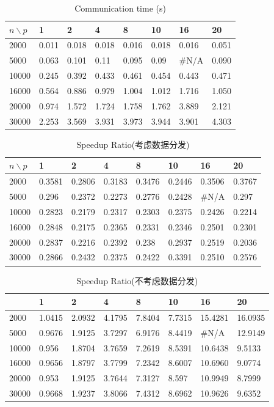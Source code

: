 \documentclass[UTF8, onecolumn, a4paper]{article}
\begin{document}
\begin{table}[htb]
	\centering
	\begin{tabular}{l|lllllll}
		\hline
		$n \backslash p$& 1 & 2 & 4 & 8 & 10 & 16 & 20 \\ \hline
		2000 & 0.011 & 0.018 & 0.018 & 0.016 & 0.018 & 0.016 & 0.051 \\ \hline
		5000 & 0.063 & 0.101 & 0.11 & 0.095 & 0.09 & \#N/A & 0.090 \\ \hline
		10000 & 0.245 & 0.392 & 0.433 & 0.461 & 0.454 & 0.443 & 0.471 \\ \hline
		16000 & 0.564 & 0.886 & 0.979 & 1.004 & 1.012 & 1.716 & 1.050 \\ \hline
		20000 & 0.974 & 1.572 & 1.724 & 1.758 & 1.762 & 3.889 & 2.121 \\ \hline
		30000 & 2.253 & 3.569 & 3.931 & 3.973 & 3.944 & 3.901 & 4.303 \\ \hline
	\end{tabular}
	\caption{Communication time (s)}
\end{table}
\begin{table}[htb]
	\centering
	\begin{tabular}{l|lllllll}
		\hline
		$n \backslash p$& 1 & 2 & 4 & 8 & 10 & 16 & 20 \\ \hline
		2000 & 0.3581 & 0.2806 & 0.3183 & 0.3476 & 0.2446 & 0.3506 & 0.3767 \\ \hline
		5000 & 0.296 & 0.2372 & 0.2273 & 0.2776 & 0.2428 & \#N/A & 0.297 \\ \hline
		10000 & 0.2823 & 0.2179 & 0.2317 & 0.2303 & 0.2375 & 0.2426 & 0.2214 \\ \hline
		16000 & 0.2848 & 0.2175 & 0.2365 & 0.2331 & 0.2346 & 0.2501 & 0.2301 \\ \hline
		20000 & 0.2837 & 0.2216 & 0.2392 & 0.238 & 0.2937 & 0.2519 & 0.2036 \\ \hline
		30000 & 0.2866 & 0.2432 & 0.2375 & 0.2422 & 0.3391 & 0.2510 & 0.2576 \\ \hline
	\end{tabular}
	\caption{Speedup Ratio(考虑数据分发)}
\end{table}
\begin{table}[htb]
	\centering
	\begin{tabular}{l|lllllll}
		\hline
		& 1 & 2 & 4 & 8 & 10 & 16 & 20 \\ \hline
		2000 & 1.0415 & 2.0932 & 4.1795 & 7.8404 & 7.7315 & 15.4281 & 16.0935 \\ \hline
		5000 & 0.9676 & 1.9125 & 3.7297 & 6.9176 & 8.4419 & \#N/A & 12.9149 \\ \hline
		10000 & 0.956 & 1.8704 & 3.7659 & 7.2619 & 8.5391 & 10.6438 & 9.5133 \\ \hline
		16000 & 0.9656 & 1.8797 & 3.7799 & 7.2342 & 8.6007 & 10.6960 & 9.0774 \\ \hline
		20000 & 0.953 & 1.9125 & 3.7644 & 7.3127 & 8.597 & 10.9949 & 8.7999 \\ \hline
		30000 & 0.9668 & 1.9237 & 3.8066 & 7.4312 & 8.6962 & 10.9626 & 9.6352 \\ \hline
	\end{tabular}
	\caption{Speedup Ratio(不考虑数据分发)}
\end{table}
\end{document}
